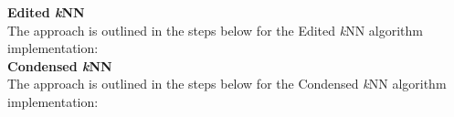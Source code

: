 \documentclass[twoside,11pt]{article}
\begin{document}
\textbf{Edited \textit{k}NN}\\
\hspace*{10mm} The approach is outlined in the steps below for the Edited \textit{k}NN algorithm implementation:\\

\textbf{Condensed \textit{k}NN}\\
\hspace*{10mm} The approach is outlined in the steps below for the Condensed \textit{k}NN algorithm implementation:\\


\begin{center}
\end{center}
\end{document}
